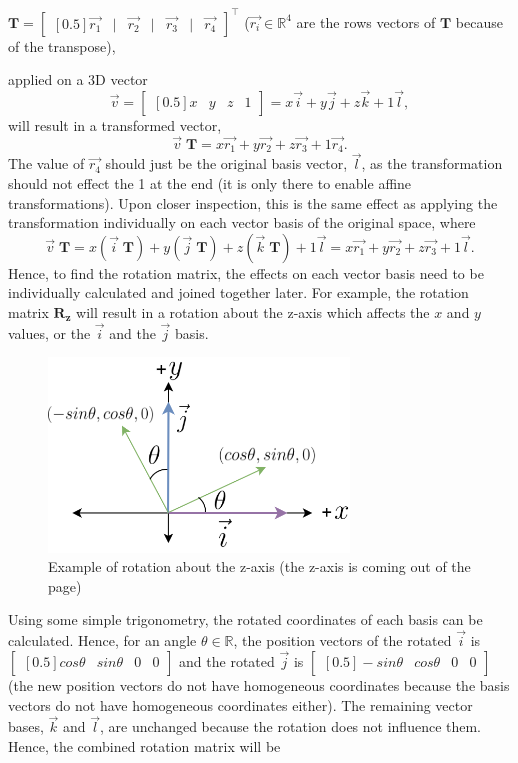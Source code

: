 \documentclass[12pt, letterpaper]{article}
\begin{document}
$\mathbf{T} = \begin{bmatrix}[0.5]\vec{r_1}&|&\vec{r_2}&|&\vec{r_3}&|&\vec{r_4}\end{bmatrix}^\intercal$ ($\vec{r_i} \in \mathbb{R}^4$ are the rows vectors of $\mathbf{T}$ because of the transpose),

\noindent applied on a 3D vector 
$$\vec{v} = \begin{bmatrix}[0.5]x&y&z&1\end{bmatrix} = x\vec{i} + y\vec{j} + z\vec{k} + 1\vec{l},$$
will result in a transformed vector, 
$$\vec{v} \; \mathbf{T} = x\vec{r_1} + y\vec{r_2} + z\vec{r_3} + 1\vec{r_4}.$$
The value of $\vec{r_4}$ should just be the original basis vector, $\vec{l}$, as the transformation should not effect the 1 at the end (it is only there to enable affine transformations). Upon closer inspection, this is the same effect as applying the transformation individually on each vector basis of the original space, where
\begin{equation}
    \vec{v} \; \mathbf{T} = x(\vec{i}\; \mathbf{T}) + y(\vec{j}\;\mathbf{T}) + z(\vec{k}\;\mathbf{T}) + 1\vec{l} = x\vec{r_1} + y\vec{r_2} + z\vec{r_3} + 1\vec{l}.
\end{equation}
Hence, to find the rotation matrix, the effects on each vector basis need to be individually calculated and joined together later. For example, the rotation matrix $\mathbf{R_z}$ will result in a rotation about the z-axis which affects the $x$ and $y$ values, or the $\vec{i}$ and the $\vec{j}$ basis. 
\begin{figure}[H]
\centering
\includegraphics[width=8cm]{rotation_example.png}
\caption{Example of rotation about the z-axis (the z-axis is coming out of the page)}
\label{fig:figure}
\end{figure}
Using some simple trigonometry, the rotated coordinates of each basis can be calculated. Hence, for an angle $\theta \in \mathbb{R}$, the position vectors of the rotated $\vec{i}$ is $\begin{bmatrix}[0.5]cos\theta&sin\theta&0&0\end{bmatrix}$ and the rotated $\vec{j}$ is $\begin{bmatrix}[0.5]-sin\theta&cos\theta&0&0\end{bmatrix}$ (the new position vectors do not have homogeneous coordinates because the basis vectors do not have homogeneous coordinates either). The remaining vector bases, $\vec{k}$ and $\vec{l}$, are unchanged because the rotation does not influence them. Hence, the combined rotation matrix will be
\end{document}
